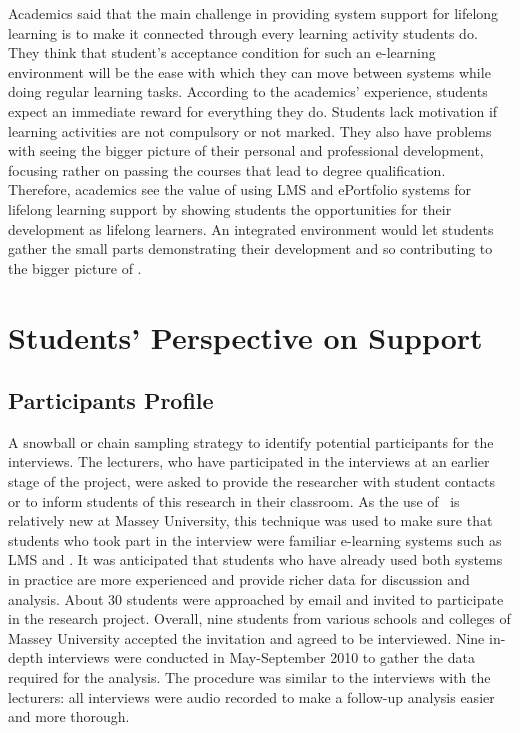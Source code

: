 Academics said that the main challenge in providing system support for lifelong
learning is to make it connected through every learning activity students do.
They think that student’s acceptance condition for such an e-learning
environment will be the ease with which they can move between systems while
doing regular learning tasks. According to the academics’ experience, students
expect an immediate reward for everything they do. Students lack motivation if
learning activities are not compulsory or not marked. They also have problems
with seeing the bigger picture of their personal and professional development,
focusing rather on passing the courses that lead to degree qualification.
Therefore, academics see the value of using LMS and ePortfolio systems for
lifelong learning support by showing students the opportunities for their
development as lifelong learners. An integrated environment would let students
gather the small parts demonstrating their development and so contributing to
the bigger picture of \LLLsn.

\section{Students' Perspective on \LLLc Support}
\subsection{Participants Profile}

A snowball or chain sampling strategy \citep{Mack2005, Marshall2010} to identify
potential participants for the interviews. The lecturers, who have participated
in the interviews at an earlier stage of the project, were asked to provide the
researcher with student contacts or to inform students of this research in their
classroom. As the use of \ep~is relatively new at Massey University, this
technique was used to make sure that students who took part in the interview
were familiar e-learning systems such as LMS and \ep. It was anticipated that
students who have already used both systems in practice are more experienced and
provide richer data for discussion and analysis. About 30 students were
approached by email and invited to participate in the research project. Overall,
nine students from various schools and colleges of Massey University accepted
the invitation and agreed to be interviewed. Nine in-depth interviews were
conducted in May-September 2010 to gather the data required for the analysis.
The procedure was similar to the interviews with the lecturers: all interviews
were audio recorded to make a follow-up analysis easier and more thorough.

